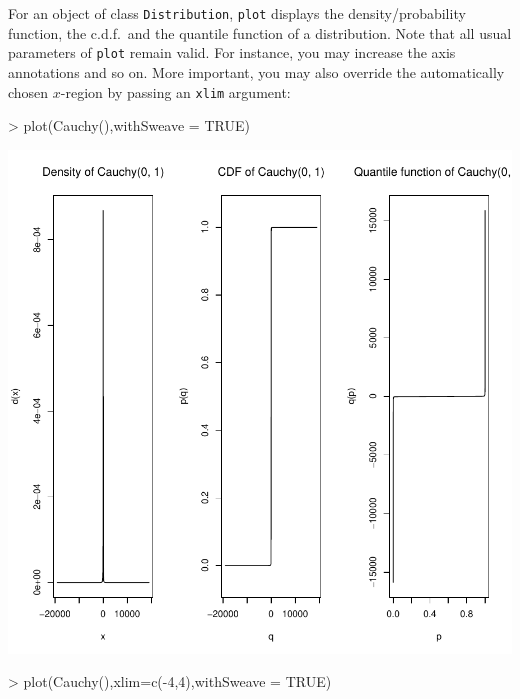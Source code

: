 \documentclass[11pt]{article}
\newcommand{\code}[1]{{\tt #1}}
\begin{document}
For an object of class \code{Distribution},
\code{plot} displays the density/probability function, the c.d.f.\ and the 
quantile function of a distribution. Note that all usual parameters of 
\code{plot} remain valid. For instance, you may increase the axis annotations 
and so on. More important, you may also 
override the automatically chosen $x$-region by passing an \code{xlim} argument:
\begin{Schunk}
\begin{Sinput}
>   plot(Cauchy(),withSweave = TRUE)
\end{Sinput}
\end{Schunk}
\includegraphics{distr-cauchy1}
\begin{Schunk}
\begin{Sinput}
>   plot(Cauchy(),xlim=c(-4,4),withSweave = TRUE)
\end{Sinput}
\end{Schunk}
\end{document}
